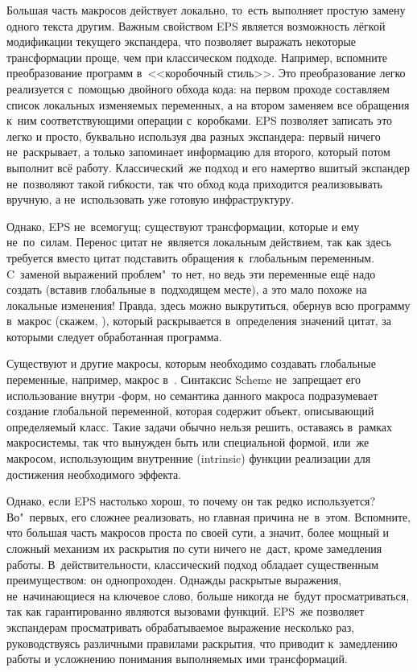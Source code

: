Большая часть макросов действует локально, то~есть выполняет простую замену
одного текста другим. Важным свойством EPS является возможность лёгкой
модификации текущего экспандера, что позволяет выражать некоторые трансформации
проще, чем при классическом подходе. Например, вспомните преобразование программ
в~<<коробочный стиль>>.  Это
преобразование легко реализуется с~помощью двойного обхода кода: на первом
проходе составляем список локальных изменяемых переменных, а на втором заменяем
все обращения к~ним соответствующими операции с~коробками. EPS позволяет
записать это легко и просто, буквально используя два разных экспандера: первый
ничего не~раскрывает, а только запоминает информацию для второго, который потом
выполнит всё работу. Классический~же подход и его намертво вшитый экспандер
не~позволяют такой гибкости, так что обход кода приходится реализовывать
вручную, а не~использовать уже готовую инфраструктуру.

Однако, EPS не~всемогущ; существуют трансформации, которые и ему не~по~силам.
 Перенос цитат не~является локальным
действием, так как здесь требуется вместо цитат подставить обращения
к~глобальным переменным. C~заменой выражений проблем"~то нет, но ведь эти
переменные ещё надо создать (вставив глобальные  в~подходящем месте),
а это мало похоже на локальные изменения! Правда, здесь можно выкрутиться,
обернув всю программу в~макрос (скажем, ), который
раскрывается в~определения значений цитат, за которыми следует обработанная
программа.

Существуют и другие макросы, которым необходимо создавать глобальные переменные,
например, макрос  в~{\Meroonet}. Синтаксис Scheme не~запрещает
его использование внутри -форм, но семантика данного макроса
подразумевает создание глобальной переменной, которая содержит объект,
описывающий определяемый класс. Такие задачи обычно нельзя решить, оставаясь
в~рамках макросистемы, так что  вынужден быть или специальной
формой, или~же макросом, использующим внутренние (intrinsic) функции реализации
для достижения необходимого эффекта.

Однако, если EPS настолько хорош, то почему он так редко используется?
Во"~первых, его сложнее реализовать, но главная причина не~в~этом. Вспомните, что большая
часть макросов проста по своей сути, а значит, более мощный и сложный механизм
их раскрытия по сути ничего не~даст, кроме замедления работы.
В~действительности, классический подход обладает существенным преимуществом: он
однопроходен. Однажды раскрытые выражения, не~начинающиеся на ключевое слово,
больше никогда не~будут просматриваться, так как гарантированно являются
вызовами функций. EPS~же позволяет экспандерам просматривать обрабатываемое
выражение несколько раз, руководствуясь различными правилами раскрытия, что
приводит к~замедлению работы и усложнению понимания выполняемых ими
трансформаций.


